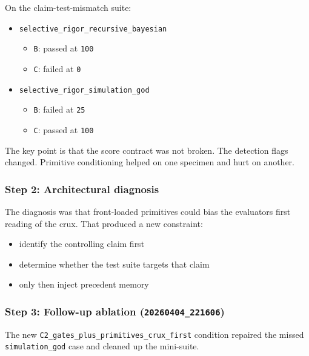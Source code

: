 \documentclass[
]{article}
\providecommand{\tightlist}{%
  \setlength{\itemsep}{0pt}\setlength{\parskip}{0pt}}
\begin{document}
On the claim-test-mismatch suite:

\begin{itemize}
\tightlist
\item
  \texttt{selective\_rigor\_recursive\_bayesian}

  \begin{itemize}
  \tightlist
  \item
    \texttt{B}: passed at \texttt{100}
  \item
    \texttt{C}: failed at \texttt{0}
  \end{itemize}
\item
  \texttt{selective\_rigor\_simulation\_god}

  \begin{itemize}
  \tightlist
  \item
    \texttt{B}: failed at \texttt{25}
  \item
    \texttt{C}: passed at \texttt{100}
  \end{itemize}
\end{itemize}

The key point is that the score contract was not broken. The detection
flags changed. Primitive conditioning helped on one specimen and hurt on
another.

\subsubsection{Step 2: Architectural
diagnosis}\label{step-2-architectural-diagnosis}

The diagnosis was that front-loaded primitives could bias the
evaluator\textquotesingle s first reading of the crux. That produced a
new constraint:

\begin{itemize}
\tightlist
\item
  identify the controlling claim first
\item
  determine whether the test suite targets that claim
\item
  only then inject precedent memory
\end{itemize}

\subsubsection{\texorpdfstring{Step 3: Follow-up ablation
(\texttt{20260404\_221606})}{Step 3: Follow-up ablation (20260404\_221606)}}\label{step-3-follow-up-ablation-20260404_221606}

The new \texttt{C2\_gates\_plus\_primitives\_crux\_first} condition
repaired the missed \texttt{simulation\_god} case and cleaned up the
mini-suite.
\end{document}
